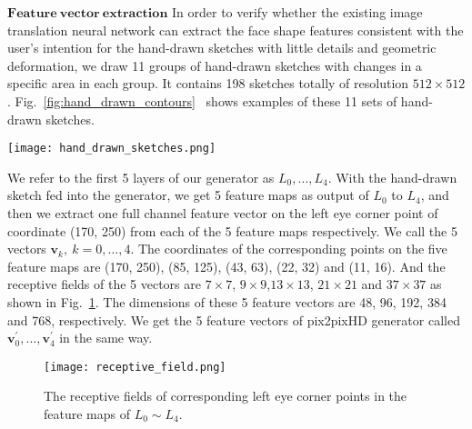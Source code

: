 \documentclass[10pt,twocolumn,letterpaper]{article}
\begin{document}
\noindent
$\mathbf{Feature ~vector ~extraction}$ In order to verify whether the existing image translation neural network can extract the face shape features consistent with the user's intention for the hand-drawn sketches with little details and geometric deformation, we draw 11 groups of hand-drawn sketches with changes in a specific area in each group. It contains 198 sketches totally of resolution $512\times512$. Fig.~\ref{fig:hand_drawn_contours}~ shows examples of these 11 sets of hand-drawn sketches.  
\begin{figure*}[htbp]
	\centering
	\texttt{[image: hand\_drawn\_sketches.png]}
	\caption{These sketches can be divided into 11 categories. G1:Add hair; G2:Add new attributes, such as whiskers, wrinkles, ears; G3:Change face shape; G4:Change eyebrows; G5:Change eye shape; G6:changes eye size; G7:Graffiti-drawn; G8:Change mouth; G9:Change nose; G10:Change mouth(same eyes as G9); G11:Change nose(same eyes as G8). Specifically, there is no correlation between G7 and the other 10 categories. Except G7, the sketch in other categories only changes a particular area or attribute while the rest of the sketch remains the same. Except for the same eye between G8 and G11, G9 and G10, the eye lines of other categories of sketches are different.}
	\label{fig:hand_drawn_contours}
\end{figure*}

We refer to the first 5 layers of our generator as $L_0,\ldots,L_4$. 
With the hand-drawn sketch fed into the generator, we get 5 feature maps as output of $L_0$ to $L_4$, and then we extract one full channel feature vector on the left eye corner point of coordinate (170, 250) from each of the 5 feature maps respectively. 
We call the 5 vectors $\boldsymbol{v}_k,~k=0,\ldots,4$. 
The coordinates of the corresponding points on the five feature maps are (170, 250), (85, 125), (43, 63), (22, 32) and (11, 16). 
And the receptive fields of the 5 vectors are $7\times7$, $9\times9$,$13\times13$, $21\times21$ and $37\times37$ as shown in Fig.~\ref{fig:receptive}. 
The dimensions of these 5 feature vectors are 48, 96, 192, 384 and 768, respectively. 
We get the 5 feature vectors of pix2pixHD generator called $\boldsymbol{v}_0^{'},\ldots,\boldsymbol{v}_4^{'}$ in the same way.
\begin{figure}[htbp]
	\begin{center}
		\texttt{[image: receptive\_field.png]}
	\end{center}
	\caption{The receptive fields of corresponding left eye corner points in the feature maps of $L_0\sim L_4$. }
	\label{fig:receptive}
\end{figure}
\end{document}
